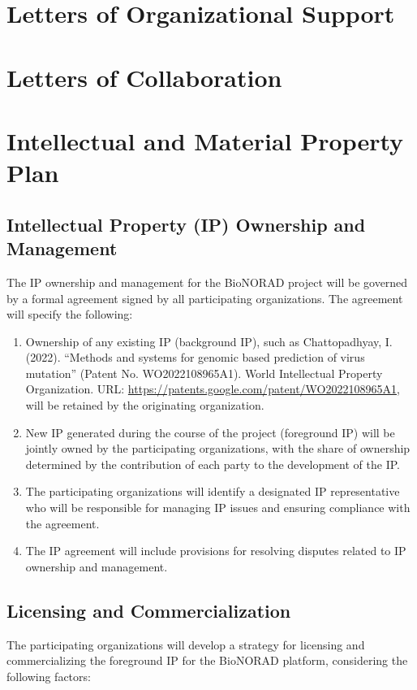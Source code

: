 \documentclass[onecolumn, compsoc,12pt]{IEEEtran}
\begin{document}
\clearpage

\section*{Letters of Organizational Support}

\clearpage

\section*{Letters of Collaboration}
\clearpage

\section*{Intellectual and Material Property Plan}

\subsection{Intellectual Property (IP) Ownership and Management}
The IP ownership and management for the BioNORAD project will be governed by a formal agreement signed by all participating organizations. The agreement will specify the following:

\begin{enumerate}
    \item Ownership of any existing IP (background IP), such as Chattopadhyay, I. (2022). ``Methods and systems for genomic based prediction of virus mutation'' (Patent No. WO2022108965A1). World Intellectual Property Organization. URL: \url{https://patents.google.com/patent/WO2022108965A1}, will be retained by the originating organization.
    \item New IP generated during the course of the project (foreground IP) will be jointly owned by the participating organizations, with the share of ownership determined by the contribution of each party to the development of the IP.
    \item The participating organizations will identify a designated IP representative who will be responsible for managing IP issues and ensuring compliance with the agreement.
    \item The IP agreement will include provisions for resolving disputes related to IP ownership and management.
\end{enumerate}

\subsection{Licensing and Commercialization}
The participating organizations will develop a strategy for licensing and commercializing the foreground IP for the BioNORAD platform, considering the following factors:
\end{document}
